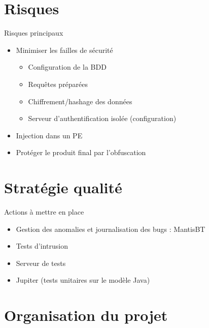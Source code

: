 \documentclass{cubeamer}
\begin{document}
\section{Risques}

\begin{frame}{Risques principaux}
    \begin{itemize}
        \item Minimiser les failles de sécurité
            \begin{itemize}
                \item Configuration de la BDD
                \item Requêtes préparées
                \item Chiffrement/hashage des données
                \item Serveur d'authentification isolée (configuration)
            \end{itemize}
        \item Injection dans un PE
        \item Protéger le produit final par l'obfuscation
    \end{itemize}
\end{frame}

\section{Stratégie qualité} %

\begin{frame}{Actions à mettre en place}
    \begin{itemize}
        \item Gestion des anomalies et journalisation des bugs : MantisBT
        \item Tests d'intrusion
        \item Serveur de tests
        \item Jupiter (tests unitaires sur le modèle Java)
    \end{itemize}
\end{frame}

\section{Organisation du projet} %
\end{document}
